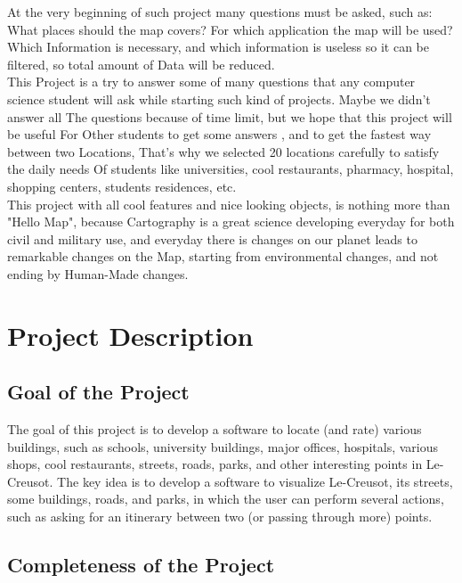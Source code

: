 \documentclass[a4paper, 12pt, english]{book}
\begin{document}
At the very beginning of such project many questions must be asked, such as: 
What places should the map covers? For which application the map will be used?
Which Information is necessary, and which information is useless so it can be 
filtered, so total amount of Data will be reduced.\\

This Project is a try to answer some of many questions that any computer 
science student will ask while starting such kind of projects. Maybe we 
didn't answer all The questions because of time limit, but we hope that 
this project will be useful For Other students to get some answers , and 
to get the fastest way between two Locations, That's why we selected 20 
locations carefully to satisfy the daily needs Of students like universities, 
cool restaurants, pharmacy, hospital, shopping centers, students residences, etc.\\

This project with all cool features and nice looking objects, is nothing more 
than "Hello Map", because Cartography is a great science developing everyday 
for both civil and military use, and everyday there is changes on our planet 
leads to remarkable changes on the Map, starting from environmental changes, and not ending by Human-Made changes. 

\chapter{Project Description}
\section{Goal of the Project}
The goal of this project is to develop a software to locate (and rate) various buildings, such as schools, university buildings, major offices, hospitals, various shops, cool restaurants, streets, roads, parks, and other interesting points in Le-Creusot.
The key idea is to develop a software to visualize Le-Creusot, its streets, some
buildings, roads, and parks, in which the user can perform several actions, such as asking for an itinerary between two (or passing through more) points.
\section{Completeness of the Project}
\end{document}
